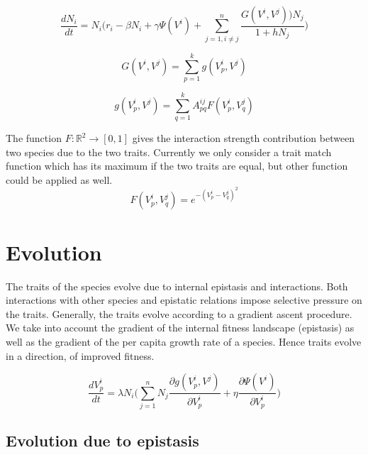 \documentclass[
12.5pt, 					%
a4paper, 				%
oneside,					%
headinclude,footinclude, %
BCOR5mm, 				%
abstract=on
]{scrreprt}
\numberwithin{equation}{chapter}
\begin{document}
\begin{equation}
\label{eq:population_dynamics}
\frac{dN_i}{dt} = N_i \Big(r_i - \beta N_i + \gamma \Psi(V^i) + \sum_{j=1, i \neq j}^n \frac{G(V^i, V^j) ) N_j}{1 + h N_j} \Big)
\end{equation}



\begin{equation}
\label{eq:population_dynamics_interactions}
G(V^i, V^j) = \sum_{p=1}^{k} g(V^i_p, V^j)
\end{equation}

\begin{equation}
\label{eq:population_dynamics_interactions}
g(V^i_p, V^j) = \sum_{q=1}^{k} A^{ij}_{pq} F(V^i_p, V^j_q) 
\end{equation}


The function $F:  \mathbb{R}^2 \rightarrow [0,1]$ gives the interaction strength contribution between two species due to the two traits. Currently we only consider a trait match function which has its maximum if the two traits are equal, but other function could be applied as well.
\newline
\begin{equation}
\label{eq:population_dynamics_interactions}
F(V^i_p, V^j_q) = e^{-(V^i_p - V^j_q)^2}
\end{equation}

\section*{Evolution}

The traits of the species evolve due to internal epistasis and interactions.
Both interactions with other species and epistatic relations impose selective pressure on the traits. Generally, the traits evolve according to a gradient ascent procedure. 
We take into account the gradient of the internal fitness landscape (epistasis) as well as the gradient of the per capita growth rate of a species. Hence traits evolve in a direction, of improved fitness.


\begin{equation}
\label{eq:trait_change}
\frac{dV^i_p}{dt} = 
\lambda N_i
\Big(
\sum_{j=1}^{n} N_j \frac{\partial g(V^i_p, V^j)}{\partial V^i_p} + 
\eta \frac{\partial \Psi(V^i)}{\partial V^i_p}
\Big)
\end{equation}



\subsection*{Evolution due to epistasis}
\vspace{0.5cm}
\end{document}
